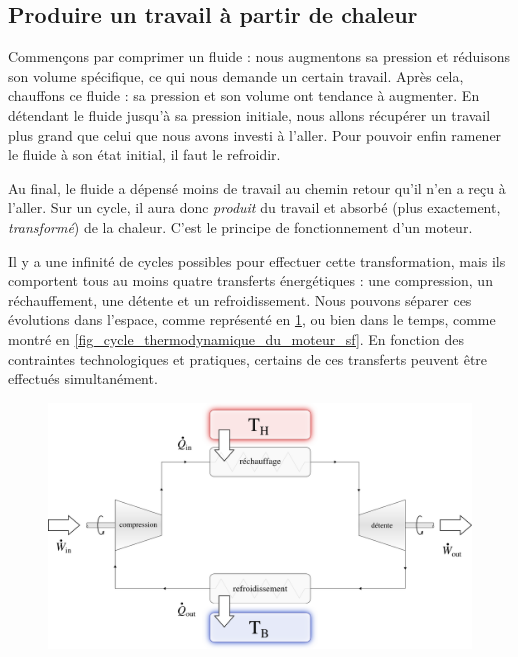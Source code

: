 	\subsection{Produire un travail à partir de chaleur}
	\label{ch_principe_fonctionnement_moteur}

		Commençons par comprimer un fluide : nous augmentons sa pression et réduisons son volume spécifique, ce qui nous demande un certain travail. Après cela, chauffons ce fluide : sa pression et son volume ont tendance à augmenter. En détendant le fluide jusqu’à sa pression initiale, nous allons récupérer un travail plus grand que celui que nous avons investi à l’aller. Pour pouvoir enfin ramener le fluide à son état initial, il faut le refroidir.

		Au final, le fluide a dépensé moins de travail au chemin retour qu’il n’en a reçu à l’aller. Sur un cycle, il aura donc \emph{produit} du travail et absorbé (plus exactement, \emph{transformé}) de la chaleur. C’est le principe de fonctionnement d’un moteur.

		Il y a une infinité de cycles possibles pour effectuer cette transformation, mais ils comportent tous au moins quatre transferts énergétiques : une compression, un réchauffement, une détente et un refroidissement. Nous pouvons séparer ces évolutions dans l’espace, comme représenté en \cref{fig_cycle_thermodynamique_du_moteur_so}, ou bien dans le temps, comme montré en \cref{fig_cycle_thermodynamique_du_moteur_sf}. En fonction des contraintes technologiques et pratiques, certains de ces transferts peuvent être effectués simultanément.

		\begin{figure}
			\begin{center}
				\includegraphics[width=\textwidth]{images/moteur_so.png}
			\end{center}
			\label{fig_cycle_thermodynamique_du_moteur_so}
		\end{figure}

